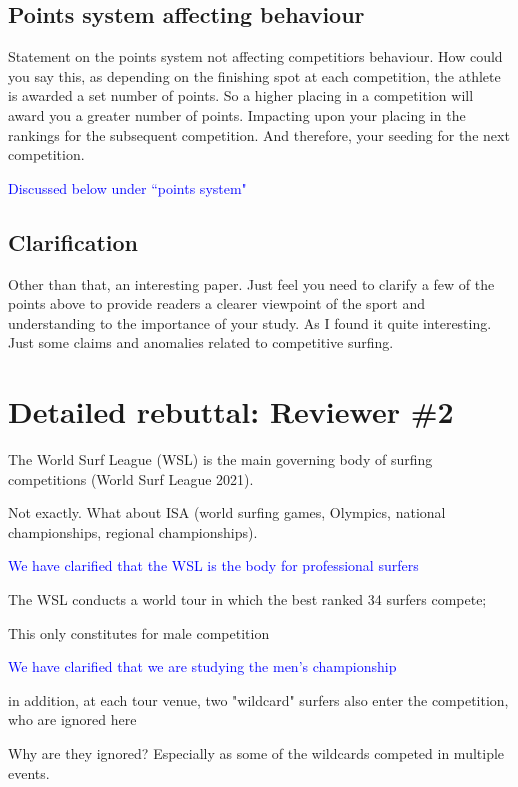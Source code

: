 \documentclass[12pt]{article}
\begin{document}
\subsection*{Points system affecting behaviour}


Statement on the points system not affecting competitiors
behaviour. How could you say this, as depending on the finishing spot
at each competition, the athlete is awarded a set number of points. So
a higher placing in a competition will award you a greater number of
points. Impacting upon your placing in the rankings for the subsequent
competition. And therefore, your seeding for the next competition.


\textcolor{blue}{Discussed below under ``points system"}

\subsection*{Clarification}


Other than that, an interesting paper. Just feel you need to clarify a
few of the points above to provide readers a clearer viewpoint of the
sport and understanding to the importance of your study. As I found it
quite interesting. Just some claims and anomalies related to
competitive surfing.
  

\section*{Detailed rebuttal: Reviewer \#2}


The World Surf League (WSL) is the main governing
body of surfing competitions (World Surf League 2021).

Not exactly. What about ISA (world surfing games, Olympics, national
championships, regional championships).


\textcolor{blue}{We have clarified that the WSL is the body for professional surfers}


The WSL conducts a
world tour in which the best ranked 34 surfers compete;

This only constitutes for male competition

\textcolor{blue}{We have clarified that we are studying the men's
  championship}

in addition, at each tour venue, two "wildcard" surfers also enter the
competition, who are ignored here

Why are they ignored? Especially as some of the wildcards competed in multiple events.
\end{document}

